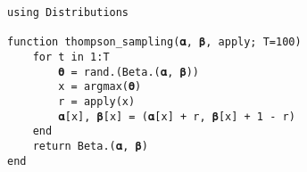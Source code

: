 \documentclass[11pt]{article}
\begin{document}
\begin{lstlisting}[language=JuliaLocal, style=julia]
using Distributions

function thompson_sampling(𝛂, 𝛃, apply; T=100)
    for t in 1:T
        𝛉 = rand.(Beta.(𝛂, 𝛃))
        x = argmax(𝛉)
        r = apply(x)
        𝛂[x], 𝛃[x] = (𝛂[x] + r, 𝛃[x] + 1 - r)
    end
    return Beta.(𝛂, 𝛃)
end
\end{lstlisting}
\end{document}
